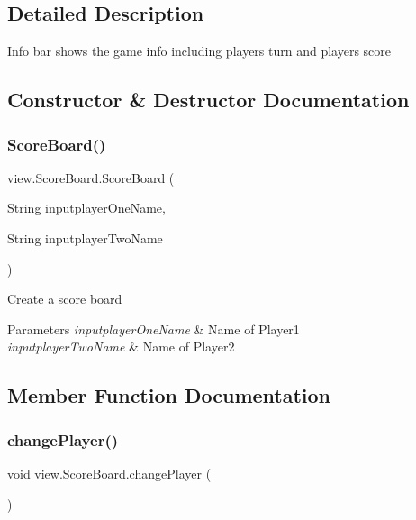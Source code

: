 \subsection{Detailed Description}
Info bar shows the game info including player\textquotesingle{}s turn and player\textquotesingle{}s score 

\subsection{Constructor \& Destructor Documentation}
\mbox{\label{classview_1_1_score_board_ad9bcca8602465dc9c33b93053353a4fa}} 
\subsubsection{\texorpdfstring{ScoreBoard()}{ScoreBoard()}}
{\footnotesize\ttfamily view.\+Score\+Board.\+Score\+Board (\begin{DoxyParamCaption}\item[{String}]{inputplayer\+One\+Name,  }\item[{String}]{inputplayer\+Two\+Name }\end{DoxyParamCaption})\hspace{0.3cm}{\ttfamily [inline]}}

Create a score board 
\begin{DoxyParams}{Parameters}
{\em inputplayer\+One\+Name} & Name of Player1 \\
\hline
{\em inputplayer\+Two\+Name} & Name of Player2 \\
\hline
\end{DoxyParams}


\subsection{Member Function Documentation}
\mbox{\label{classview_1_1_score_board_a0a8523b0eb173040e140bbaa50c88a6c}} 
\subsubsection{\texorpdfstring{changePlayer()}{changePlayer()}}
{\footnotesize\ttfamily void view.\+Score\+Board.\+change\+Player (\begin{DoxyParamCaption}{ }\end{DoxyParamCaption})\hspace{0.3cm}{\ttfamily [inline]}}

